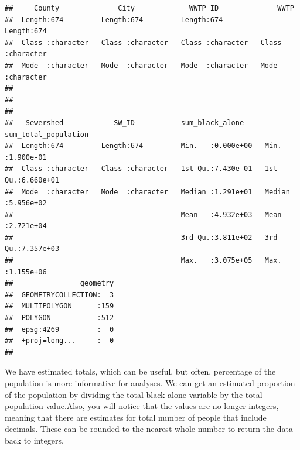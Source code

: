 \documentclass[
]{book}
\newenvironment{Shaded}{\begin{snugshade}}{\end{snugshade}}
\newcommand{\AttributeTok}[1]{\textcolor[rgb]{0.13,0.29,0.53}{#1}}
\newcommand{\CommentTok}[1]{\textcolor[rgb]{0.56,0.35,0.01}{\textit{#1}}}
\newcommand{\FunctionTok}[1]{\textcolor[rgb]{0.13,0.29,0.53}{\textbf{#1}}}
\newcommand{\NormalTok}[1]{#1}
\newcommand{\OtherTok}[1]{\textcolor[rgb]{0.56,0.35,0.01}{#1}}
\newcommand{\SpecialCharTok}[1]{\textcolor[rgb]{0.81,0.36,0.00}{\textbf{#1}}}
\newcommand{\StringTok}[1]{\textcolor[rgb]{0.31,0.60,0.02}{#1}}
\begin{document}
\begin{verbatim}
##     County              City             WWTP_ID              WWTP          
##  Length:674         Length:674         Length:674         Length:674        
##  Class :character   Class :character   Class :character   Class :character  
##  Mode  :character   Mode  :character   Mode  :character   Mode  :character  
##                                                                             
##                                                                             
##                                                                             
##   Sewershed            SW_ID           sum_black_alone     sum_total_population
##  Length:674         Length:674         Min.   :0.000e+00   Min.   :1.900e-01   
##  Class :character   Class :character   1st Qu.:7.430e-01   1st Qu.:6.660e+01   
##  Mode  :character   Mode  :character   Median :1.291e+01   Median :5.956e+02   
##                                        Mean   :4.932e+03   Mean   :2.721e+04   
##                                        3rd Qu.:3.811e+02   3rd Qu.:7.357e+03   
##                                        Max.   :3.075e+05   Max.   :1.155e+06   
##                geometry  
##  GEOMETRYCOLLECTION:  3  
##  MULTIPOLYGON      :159  
##  POLYGON           :512  
##  epsg:4269         :  0  
##  +proj=long...     :  0  
## 
\end{verbatim}

We have estimated totals, which can be useful, but often, percentage of the population is more informative for analyses. We can get an estimated proportion of the population by dividing the total black alone variable by the total population value.Also, you will notice that the values are no longer integers, meaning that there are estimates for total number of people that include decimals. These can be rounded to the nearest whole number to return the data back to integers.

\begin{Shaded}
\end{Shaded}
\end{document}
